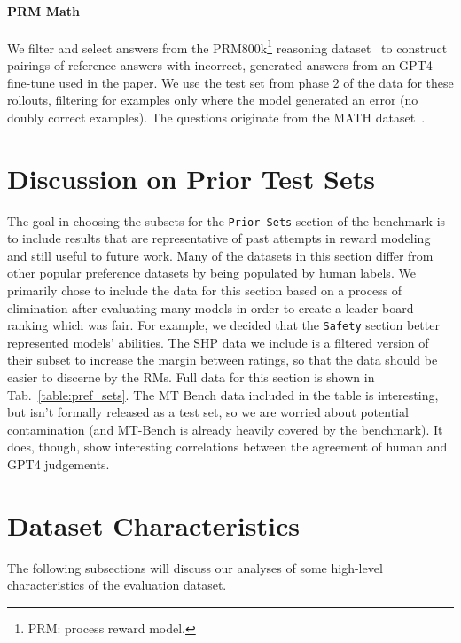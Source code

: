\begin{appendices}
\paragraph{PRM Math}
We filter and select answers from the PRM800k\footnote{PRM: process reward model.} reasoning dataset~\citep{lightman2023let} to construct pairings of reference answers with incorrect, generated answers from an GPT4 fine-tune used in the paper. 
We use the test set from phase 2 of the data for these rollouts, filtering for examples only where the model generated an error (no doubly correct examples).
The questions originate from the MATH dataset~\citep{hendrycksmath2021}.






\section{Discussion on Prior Test Sets}
The goal in choosing the subsets for the \texttt{Prior Sets} section of the benchmark is to include results that are representative of past attempts in reward modeling and still useful to future work.
Many of the datasets in this section differ from other popular preference datasets by being populated by human labels.
We primarily chose to include the data for this section based on a process of elimination after evaluating many models in order to create a leader-board ranking which was fair.
For example, we decided that the \texttt{Safety} section better represented models' abilities.
The SHP data we include is a filtered version of their subset to increase the margin between ratings, so that the data should be easier to discerne by the RMs. 
Full data for this section is shown in Tab.~\ref{table:pref_sets}.
The MT Bench data included in the table is interesting, but isn't formally released as a test set, so we are worried about potential contamination (and MT-Bench is already heavily covered by the benchmark). 
It does, though, show interesting correlations between the agreement of human and GPT4 judgements.

\section{Dataset Characteristics}
\label{appdx:characteristics}

The following subsections will discuss our analyses of some high-level characteristics of the evaluation dataset.





\end{appendices}

